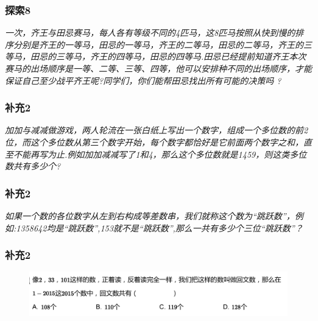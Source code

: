 \begin{frame}
    \frametitle{探索8}
    \textit{一次，齐王与田忌赛马，每人各有等级不同的4匹马，这8匹马按照从快到慢的排序分别是齐王的一等马，田忌的一等马，齐王的二等马，田忌的二等马，齐王的三等马，田忌的三等马，齐王的四等马，田忌的四等马.田忌已经提前知道齐王本次赛马的出场顺序是一等、二等、三等、四等，他可以安排种不同的出场顺序，才能保证自己至少战平齐王呢?同学们，你们能帮田忌找出所有可能的决策吗 ?}
\end{frame}

\begin{frame}
    \frametitle{补充2}
    \textit{加加与减减做游戏，两人轮流在一张白纸上写出一个数字，组成一个多位数的前2位，而这个多位数从第三个数字开始，每个数字都恰好是它前面两个数字之和，直至不能再写为止.例如加加减减写了1和4，那么这个多位数就是1459，则这类多位数共有多少个?}
\end{frame}

\begin{frame}
    \frametitle{补充2}
    \textit{如果一个数的各位数字从左到右构成等差数串，我们就称这个数为“跳跃数”，例如:1358642均是“跳跃数”,153就不是“跳跃数”,那么一共有多少个三位“跳跃数”？}
\end{frame}

\begin{frame}
    \frametitle{补充2}
    \begin{figure}[H] 
        \centering
        \includegraphics[width=1\textwidth]{./pics/Chapter_2/buchong2_3.png}
    \end{figure}
\end{frame}